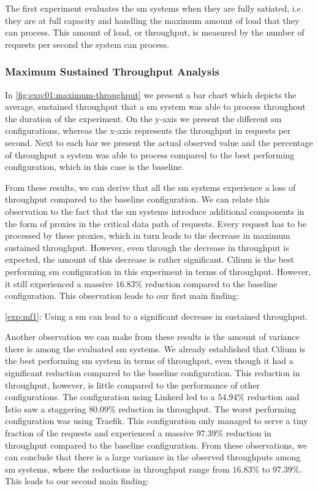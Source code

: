 The first experiment evaluates the \gls{sm} systems when they are fully satiated, i.e. they are at full capacity and handling the maximum amount of load that they can process. This amount of load, or throughput, is measured by the number of requests per second the system can process.

\subsubsection{Maximum Sustained Throughput Analysis}
\label{sec:experiments:results:per-experiment:01:throughput}

In \cref{fig:exp:01:maximum-throughput} we present a bar chart which depicts the average, sustained throughput that a \gls{sm} system was able to process throughout the duration of the experiment. On the y-axis we present the different \gls{sm} configurations, whereas the x-axis represents the throughput in requests per second. Next to each bar we present the actual observed value and the percentage of throughput a system was able to process compared to the  best performing configuration, which in this case is the baseline.

From these results, we can derive that all the \gls{sm} systems experience a loss of throughput compared to the baseline configuration. We can relate this observation to the fact that the \gls{sm} systems introduce additional components in the form of proxies in the critical data path of requests. Every request has to be processed by these proxies, which in turn leads to the decrease in maximum sustained throughput. However, even through the decrease in throughput is expected, the amount of this decrease is rather significant. Cilium is the best performing \gls{sm} configuration in this experiment in terms of throughput. However, it still experienced a massive $16.83\%$ reduction compared to the baseline configuration. This observation leads to our first main finding: 

\begin{shaded*}
    \noindent
    \ref{exp:mf1}: 
    Using a \gls{sm} can lead to a significant decrease in sustained throughput.
\end{shaded*}

Another observation we can make from these results is the amount of variance there is among the evaluated \gls{sm} systems. We already established that Cilium is the best performing \gls{sm} system in terms of throughput, even though it had a significant reduction compared to the baseline configuration. This reduction in throughput, however, is little compared to the performance of other configurations. The configuration using Linkerd led to a $54.94\%$ reduction and Istio saw a staggering $80.09\%$ reduction in throughput. The worst performing configuration was using Traefik. This configuration only managed to serve a tiny fraction of the requests and experienced a massive $97.39\%$ reduction in throughput compared to the baseline configuration. From these observations, we can conclude that there is a large variance in the observed throughputs among \gls{sm} systems, where the reductions in throughput range from $16.83\%$ to $97.39\%$. This leads to our second main finding:

